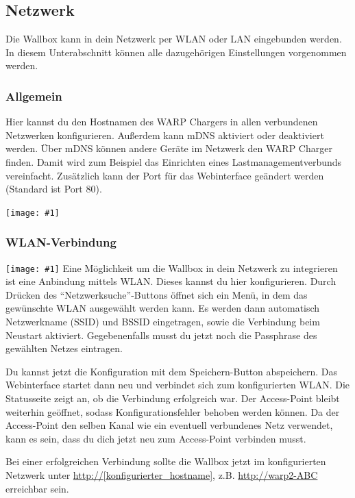 \documentclass[a4paper,10pt]{article}
\newcommand{\gfx}[1]{\texttt{[image: \#1]}}
\begin{document}
\begin{multicols*}{2}
	\subsection{Netzwerk}\label{network}
	Die Wallbox kann in dein Netzwerk per WLAN oder LAN eingebunden werden.
	In diesem Unterabschnitt können alle dazugehörigen Einstellungen vorgenommen werden.

	\subsubsection{Allgemein}
	Hier kannst du den Hostnamen des WARP Chargers in allen verbundenen Netzwerken konfigurieren. Außerdem kann mDNS aktiviert oder deaktiviert werden.
	Über mDNS können andere Geräte im Netzwerk den WARP Charger finden. Damit
	wird zum Beispiel das Einrichten eines Lastmanagementverbunds vereinfacht.
	Zusätzlich kann der Port für das Webinterface geändert werden (Standard ist
	Port 80).

	\gfx{./img_warp2/resized/web_network}


	\subsubsection{WLAN-Verbindung}
	\gfx{./img_warp2/resized/web_wifi_sta}
	Eine Möglichkeit um die Wallbox in dein Netzwerk zu integrieren ist eine
	Anbindung mittels WLAN. Dieses kannst du hier konfigurieren.
	Durch Drücken des \enquote{Netzwerksuche}-Buttons öffnet sich ein Menü, in dem das gewünschte WLAN ausgewählt werden kann.
	Es werden dann automatisch Netzwerkname (SSID) und BSSID eingetragen, sowie die Verbindung beim Neustart aktiviert.
	Gegebenenfalls musst du jetzt noch die Passphrase des gewählten Netzes eintragen.

	\vspace{-0.1cm}
	Du kannst jetzt die Konfiguration mit dem Speichern-Button abspeichern.
	Das Webinterface startet dann neu und verbindet sich zum konfigurierten WLAN. Die Statusseite zeigt
	an, ob die Verbindung erfolgreich war. Der Access-Point bleibt weiterhin
	geöffnet, sodass Konfigurationsfehler behoben werden können.
	Da der Access-Point den selben Kanal wie ein eventuell verbundenes Netz verwendet,
	kann es sein, dass du dich jetzt neu zum Access-Point verbinden musst.

	\vspace{-0.1cm}
	Bei einer erfolgreichen Verbindung sollte die Wallbox jetzt im konfigurierten Netzwerk unter
	\url{http://[konfigurierter_hostname]}, z.B. \url{http://warp2-ABC} erreichbar sein.


\end{multicols*}
\end{document}
